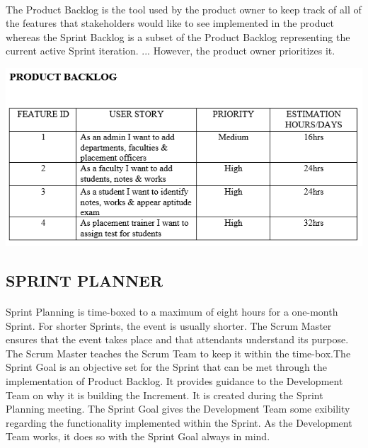 \documentclass[a4paper, 12pt]{report}
\begin{document}
\paragraph{}
The Product Backlog is the tool used by the product owner to keep track of all of the features that stakeholders would like to see implemented in the product whereas the Sprint Backlog is a subset of the Product Backlog representing the current active Sprint iteration. ... However, the product owner prioritizes it.


\includegraphics[scale=1]{product} 
\subsection{SPRINT PLANNER}

\paragraph{}
Sprint Planning is time-boxed to a maximum of eight hours for a one-month Sprint. For shorter Sprints, the event is usually shorter. The Scrum Master ensures that the event takes place and that attendants understand its purpose. The Scrum Master teaches the Scrum Team to keep it within the time-box.The Sprint Goal is an objective set for the Sprint that can be met through the implementation of Product Backlog. It provides guidance to the Development Team on why it is building the Increment. It is created during the Sprint Planning meeting. The Sprint Goal gives the Development Team some exibility regarding the functionality implemented within the Sprint. As the Development Team works, it does so with the Sprint Goal always in mind.
\end{document}
